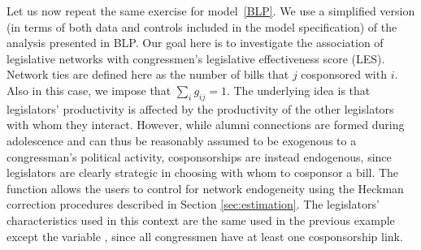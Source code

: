 \documentclass[nojss]{jss}
\begin{document}
Let us now repeat the same exercise for model~\ref{BLP}. We use a simplified version (in terms of both data and controls included in the model specification) of the analysis presented in BLP. Our goal here is to investigate the association of legislative networks with congressmen's legislative effectiveness score (LES). Network ties are defined here as the number
of bills that $j$ cosponsored with $i$. Also in this case, we impose that $\sum_{i}g_{ij}=1$. The underlying idea is that legislators' productivity is affected by the productivity of the other legislators with whom they interact. However, while alumni connections are formed during adolescence and can thus be reasonably assumed to be exogenous to a congressman's political activity, cosponsorships are instead endogenous, since legislators are clearly strategic in choosing with whom to cosponsor a bill. The function  allows the users to control for network endogeneity using the Heckman correction procedures described in Section \ref{sec:estimation}. The legislators' characteristics used in this context are the same used in the previous example except the variable , since all congressmen have at least one cosponsorship link.
\end{document}
